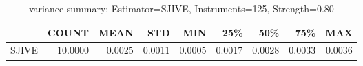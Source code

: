 \begin{table}[ht]
\centering
\caption{variance summary: Estimator=SJIVE, Instruments=125, Strength=0.80}
\begin{tabular}{lrrrrrrrr}
\toprule
 & COUNT & MEAN & STD & MIN & 25\% & 50\% & 75\% & MAX \\
\midrule
SJIVE & 10.0000 & 0.0025 & 0.0011 & 0.0005 & 0.0017 & 0.0028 & 0.0033 & 0.0036 \\
\bottomrule
\end{tabular}
\end{table}
